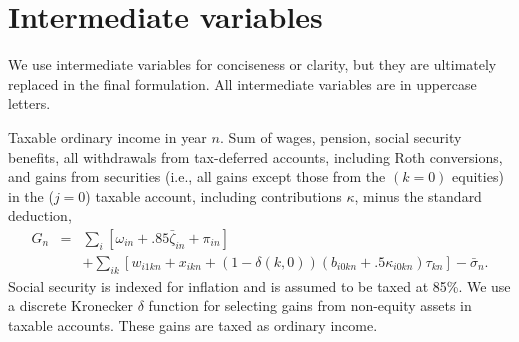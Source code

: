 \documentclass{article}[fleqn,12pt]
\begin{document}
\section{Intermediate variables}
We use intermediate variables for conciseness or clarity,
but they are ultimately replaced in the final formulation.
All intermediate variables are in uppercase letters.
\begin{description}[leftmargin=4em,style=multiline]
\item [$G_n$]
	Taxable ordinary income in year $n$. Sum of wages, pension, social security benefits, all withdrawals
	from tax-deferred accounts, including Roth conversions, and gains from securities
	(i.e., all gains except those from the $(k=0)$ equities)
	in the ($j=0$) taxable account, including contributions $\kappa$, minus the standard deduction,
	\begin{eqnarray}
		\label{Eq:Tx2}
		G_n &=& \sum_{i} [\omega_{in} + .85\bar\zeta_{in} + \pi_{in}] \nonumber \\
		&& + \sum_{ik} [w_{i1kn} + x_{ikn} +
		(1-\delta(k, 0))(b_{i0kn} + .5\kappa_{i0kn})\tau_{kn}] - \bar{\sigma}_n.
	\end{eqnarray}
	Social security is indexed for inflation and is assumed to be taxed at 85\%.
	We use a discrete Kronecker $\delta$ function for selecting gains from non-equity assets in
	taxable accounts. These gains are taxed as ordinary income.


\end{description}
\end{document}

